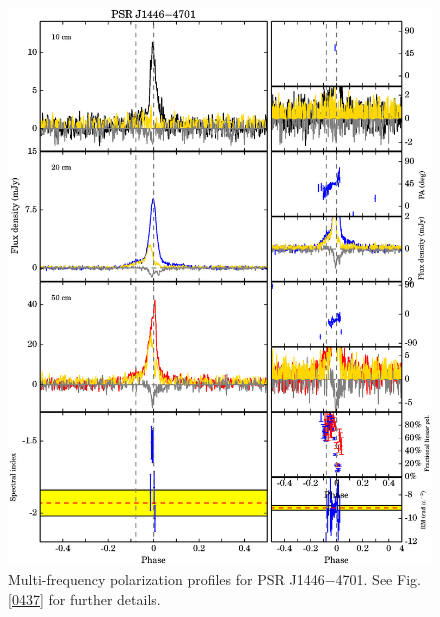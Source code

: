 \documentclass[useAMS,usenatbib]{mn2e}
\begin{document}
\begin{appendices}
\begin{figure}
\begin{center}
\includegraphics[width=6 in]{1446.ps}
\caption{Multi-frequency polarization profiles for PSR J1446$-$4701. 
See Fig. \ref{0437} for further details.}
\label{1446}
\end{center}
\end{figure}


\end{appendices}
\end{document}

